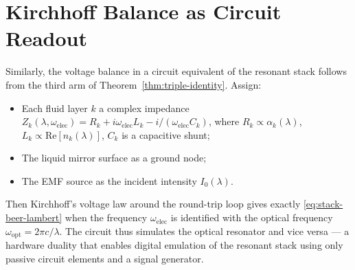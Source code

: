 \documentclass[11pt,twocolumn,a4paper]{article}
\theoremstyle{plain}
\theoremstyle{definition}
\theoremstyle{remark}
\begin{document}
\section{Kirchhoff Balance as Circuit Readout}
\label{sec:kirchhoff}

Similarly, the voltage balance in a circuit equivalent of the resonant stack follows from the third arm of Theorem~\ref{thm:triple-identity}. Assign:
\begin{itemize}[noitemsep]
  \item Each fluid layer $k$ a complex impedance $Z_k(\lambda,\omega_\text{elec})=R_k+i\omega_\text{elec}L_k-i/(\omega_\text{elec}C_k)$, where $R_k\propto\alpha_k(\lambda)$, $L_k\propto\mathrm{Re}[n_k(\lambda)]$, $C_k$ is a capacitive shunt;
  \item The liquid mirror surface as a ground node;
  \item The EMF source as the incident intensity $I_0(\lambda)$.
\end{itemize}
Then Kirchhoff's voltage law around the round-trip loop gives exactly \eqref{eq:stack-beer-lambert} when the frequency $\omega_\text{elec}$ is identified with the optical frequency $\omega_\text{opt}=2\pi c/\lambda$. The circuit thus simulates the optical resonator and vice versa — a hardware duality that enables digital emulation of the resonant stack using only passive circuit elements and a signal generator.
\end{document}
